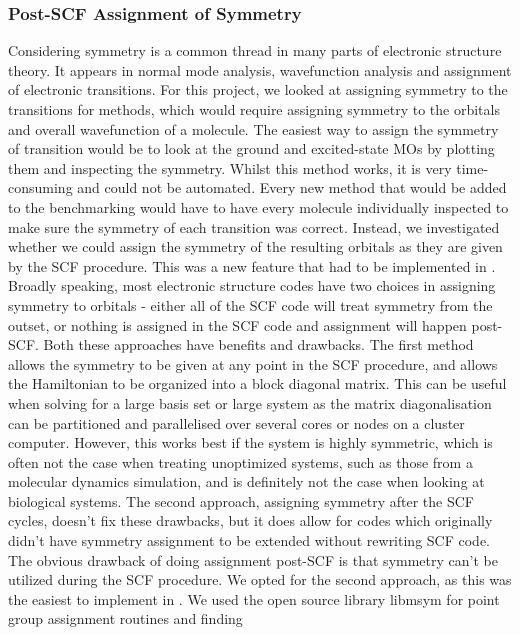 \subsubsection{Post-SCF Assignment of Symmetry}
\label{subsubsec:post_scf_symmetry}

Considering symmetry is a common thread in many parts of electronic structure 
theory. It appears in normal mode analysis, wavefunction analysis and assignment
of electronic transitions. For this project, we looked at assigning symmetry to 
the transitions for \dscf methods, which would require assigning symmetry to the
orbitals and overall wavefunction of a molecule.
The easiest way to assign the symmetry of transition would be to look at the
ground and excited-state MOs by plotting them and inspecting the symmetry. Whilst
this method works, it is very time-consuming and could not be automated. Every new
method that would be added to the benchmarking would have to have every molecule
individually inspected to make sure the symmetry of each transition was correct.
Instead, we investigated whether we could assign the symmetry of the resulting 
orbitals as they are given by the SCF procedure. This was a new feature that had
to be implemented in .
Broadly speaking, most electronic structure codes have two choices in assigning
symmetry to orbitals - either all of the SCF code will treat symmetry from the 
outset, or nothing is assigned in the SCF code and assignment will happen post-SCF.
Both these approaches have benefits and drawbacks. The first method allows the 
symmetry to be given at any point in the SCF procedure, and allows the Hamiltonian
to be organized into a block diagonal matrix. This can be useful when solving
for a large basis set or large system as the matrix diagonalisation can be
partitioned and parallelised over several cores or nodes on a cluster computer.
However, this works best if the system is highly symmetric, which is often not
the case when treating unoptimized systems, such as those from a molecular dynamics
simulation, and is definitely not the case when looking at biological systems.
The second approach, assigning symmetry after the SCF cycles, doesn't fix these
drawbacks, but it does allow for codes which originally didn't have symmetry
assignment to be extended without rewriting SCF code. The obvious drawback of
doing assignment post-SCF is that symmetry can't be utilized during the SCF procedure.
We opted for the second approach, as this was the easiest to implement in .
We used the open source library libmsym for point group assignment routines and finding
